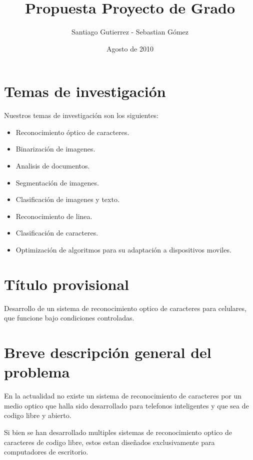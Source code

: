 \documentclass[a4paper, 11pt, oneside]{article}
\begin{document}
	\title {Propuesta Proyecto de Grado}
	\author { Santiago Gutierrez - Sebastian Gómez }
	\date {Agosto de 2010}
	\maketitle
	\clearpage
	\section{Temas de investigación}
   Nuestros temas de investigación son los siguientes:
	\begin{itemize}
   \item Reconocimiento óptico de caracteres.
   \item Binarización de imagenes.
   \item Analisis de documentos.
   \item Segmentación de imagenes.
   \item Clasificación de imagenes y texto.
   \item Reconocimiento de linea.
   \item Clasificación de caracteres.
	\item Optimización de algoritmos para su adaptación a dispositivos moviles.
	\end{itemize}
	\clearpage
	\section{Título provisional}
	Desarrollo de un sistema de reconocimiento optico de caracteres para celulares, que funcione bajo condiciones controladas.
	\clearpage
	\section{Breve descripción general del problema}
	En la actualidad no existe un sistema de reconocimiento de caracteres por un medio optico que halla sido desarrollado para telefonos inteligentes y que sea de codigo libre y abierto.

	Si bien se han desarrollado multiples sistemas de reconocimiento optico de caracteres de codigo libre, estos estan diseñados exclusivamente para computadores de escritorio.
\end{document}
